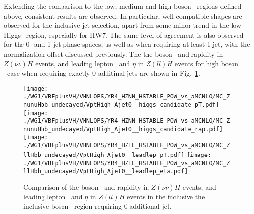 Extending the comparison to the low, medium and high boson \pt\ regions defined above,
consistent results are observed.
In particular, well compatible shapes are observed for the inclusive jet selection,
apart from some minor trend in the low Higgs \pt\ region, especially for HW7.
The same level of agreement is also observed for the 0- and 1-jet phase spaces, as well as when requiring at least 1 jet, 
with the normalization offset discussed previously.
The the boson \pt\ and rapidity in $Z(\nu\nu)H$ events, and leading lepton \pt\ and $\eta$ in $Z(ll)H$ events 
for high boson \pt\ case when requiring exactly 0 additinal jets are shown in Fig.~\ref{fig:stable__gt1j_highvpt}.
\begin{figure}[hptb]
\centering
\texttt{[image: ./WG1/VBFplusVH/VHNLOPS/YR4\_HZNN\_HSTABLE\_POW\_vs\_aMCNLO/MC\_ZnunuHbb\_undecayed/VptHigh\_Ajet0\_\_higgs\_candidate\_pT.pdf]}
\texttt{[image: ./WG1/VBFplusVH/VHNLOPS/YR4\_HZNN\_HSTABLE\_POW\_vs\_aMCNLO/MC\_ZnunuHbb\_undecayed/VptHigh\_Ajet0\_\_higgs\_candidate\_rap.pdf]}
\texttt{[image: ./WG1/VBFplusVH/VHNLOPS/YR4\_HZLL\_HSTABLE\_POW\_vs\_aMCNLO/MC\_ZllHbb\_undecayed/VptHigh\_Ajet0\_\_leadlep\_pT.pdf]}
\texttt{[image: ./WG1/VBFplusVH/VHNLOPS/YR4\_HZLL\_HSTABLE\_POW\_vs\_aMCNLO/MC\_ZllHbb\_undecayed/VptHigh\_Ajet0\_\_leadlep\_eta.pdf]}
\caption{Comparison of the boson \pt\ and rapidity in $Z(\nu\nu)H$ events, and leading lepton \pt\ and $\eta$ in $Z(ll)H$ events in the inclusive 
the inclusive boson \pt\ region requiring 0 additional jet.}
\label{fig:stable__gt1j_highvpt}
\end{figure}

